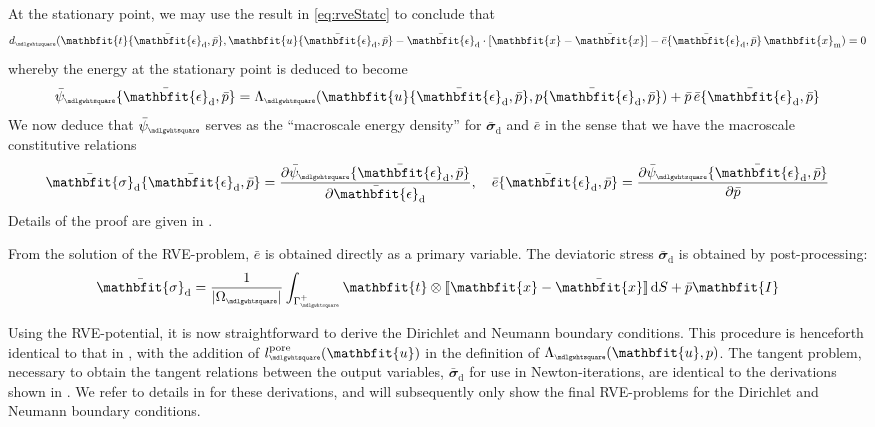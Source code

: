 \documentclass[12pt,a4paper]{article}
\renewcommand{\ta}[1]{\mathbfit{#1}}
\renewcommand{\ts}[1]{\mathbfit{#1}}
\renewcommand{\Box}{\mdlgwhtsquare}
\DeclarePairedDelimiter{\jmp}{[\![}{]\!]}
\renewcommand{\dev}{\mathrm{d}}
\newcommand{\volume}{|\Omega_\rve|}
\newcommand{\pore}{\mathrm{pore}}
\newcommand{\epspargs}{\{{\bar{\ts\epsilon}}_\dev, \bar{p}\}}
\newcommand{\rve}{
  {\mathchoice
   {\mbox{\scalebox{0.67}{$\Box$}}}
   {\mbox{\scalebox{0.67}{$\Box$}}}
   {\mbox{\scalebox{0.5}{$\Box$}}}
   {\mbox{\scalebox{0.375}{$\Box$}}}
  }
}
\begin{document}
At the stationary point, we may use the result in \cref{eq:rveStatc} to conclude that
\begin{equation}
    d_\rve(\ta{t}\epspargs,\ta{u}\epspargs-\bar{\ts\epsilon}_\dev\cdot[\ta{x}-\bar{\ta{x}}]-\bar{e}\epspargs\,\ta{x}_\mean) = 0
\label{eq86}
\end{equation}
whereby the energy at the stationary point is deduced to become
\begin{equation}
    \bar{\psi}_\rve\epspargs =
    \Lambda_\rve(\ta{u}\epspargs,p\epspargs) + \bar{p}\,\bar{e}\epspargs
\label{eq87}
\end{equation}
We now deduce that $\bar{\psi}_\rve$ serves as the ``macroscale energy density'' for $\bar{\ts\sigma}_\dev$ and $\bar{e}$ in the sense that we have the macroscale constitutive relations
\begin{equation}
    \bar{\ts\sigma}_\dev\epspargs = \frac{\partial \bar{\psi}_\rve\epspargs}{\partial \bar{\ts\epsilon}_\dev}, \quad
     \bar{e}\epspargs = \frac{\partial \bar{\psi}_\rve\epspargs}{\partial \bar{p}}
\label{eq88}
\end{equation}
Details of the proof are given in \cite{ohman_computational_2014}. \todo{*}

From the solution of the RVE-problem, $\bar{e}$ is obtained directly as a primary variable.
The deviatoric stress $\bar{\ts\sigma}_\dev$ is obtained by post-processing:
\begin{align}
 \bar{\ts\sigma}_\dev = \frac{1}{\volume} \int_{\Gamma_\rve^+} \ta t \outerp \jmp{\ta x - \bar{\ta x}}\dif S + \bar{p}\ts I
\label{eq:weak_periodic_sigma_dev}
\end{align}

Using the RVE-potential, it is now straightforward to derive the Dirichlet and Neumann boundary conditions. This procedure is henceforth identical to that in \cite{ohman_computational_2014}, with the addition of $l_\rve^\pore(\ta u)$ in the definition of $\Lambda_\rve(\ta u,p)$.
The tangent problem, necessary to obtain the tangent relations between the output variables, $\bar{\ts\sigma}_\dev$ for use in Newton-iterations, are identical to the derivations shown in \cite{ohman_computational_2014}.
We refer to details in \cite{ohman_computational_2014} for these derivations, and will subsequently only show the final RVE-problems for the Dirichlet and Neumann boundary conditions.
\end{document}
